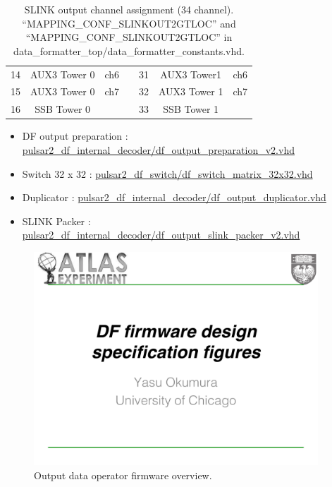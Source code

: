 \documentclass[11pt,letterpaper]{article}
\begin{document}
\begin{table}[h]
\begin{tabular}{|c|c|c|c|c|c|c|}
14   & AUX3 Tower 0      & ch6          &  & 31   & AUX3 Tower1       & ch6          \\ \cline{1-3} \cline{5-7} 
15   & AUX3 Tower 0      & ch7          &  & 32   & AUX3 Tower 1      & ch7          \\ \cline{1-3} \cline{5-7} 
16   & SSB Tower 0       &              &  & 33   & SSB Tower 1       &              \\ \cline{1-3} \cline{5-7} 
\end{tabular}
\caption{SLINK output channel assignment (34 channel). 
``MAPPING\_CONF\_SLINKOUT2GTLOC'' and ``MAPPING\_CONF\_SLINKOUT2GTLOC'' in data\_formatter\_top/data\_formatter\_constants.vhd.}
\end{table}



\begin{itemize}
\item DF output preparation : \url{pulsar2_df_internal_decoder/df_output_preparation_v2.vhd}
\item Switch 32 x 32 : \url{pulsar2_df_switch/df_switch_matrix_32x32.vhd}
\item Duplicator : \url{pulsar2_df_internal_decoder/df_output_duplicator.vhd}
\item SLINK Packer : \url{pulsar2_df_internal_decoder/df_output_slink_packer_v2.vhd}
\end{itemize}

\begin{figure}[h!]
  \centering
  \includegraphics[width=0.95\textwidth,clip,page=9]{figures.pdf}
  \caption{Output data operator firmware overview.}
  \label{fig:OUTPUT_DATA_OPERATOR_OVERVIEW}
\end{figure}
\end{document}

